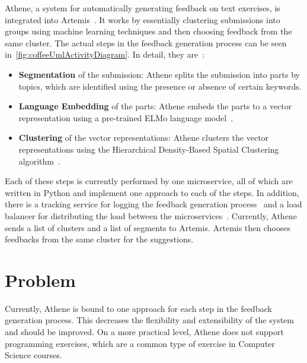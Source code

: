 Athene, a system for automatically generating feedback on text exercises, is integrated into Artemis~\cite{cofee}. It works by essentially clustering submissions into groups using machine learning techniques and then choosing feedback from the same cluster. The actual steps in the feedback generation process can be seen in~\cref{fig:coffeeUmlActivityDiagram}. In detail, they are~\cite{cofee}:
\begin{itemize}
    \item \textbf{Segmentation} of the submission: Athene splits the submission into parts by topics, which are identified using the presence or absence of certain keywords.
    \item \textbf{Language Embedding} of the parts: Athene embeds the parts to a vector representation using a pre-trained ELMo language model~\cite{deepContextualizedWordRepresentations}.
    \item \textbf{Clustering} of the vector representations: Athene clusters the vector representations using the Hierarchical Density-Based Spatial Clustering algorithm~\cite{hdbsc}.
\end{itemize}

Each of these steps is currently performed by one microservice, all of which are written in Python and implement one approach to each of the steps.
In addition, there is a tracking service for logging the feedback generation process~\cite{atheneTracking} and a load balancer for distributing the load between the microservices~\cite{atheneLoadBalancer}.
Currently, Athene sends a list of clusters and a list of segments to Artemis. Artemis then chooses feedbacks from the same cluster for the suggestions.


\section*{Problem}

Currently, Athene is bound to one approach for each step in the feedback generation process. This decreases the flexibility and extensibility of the system and should be improved.
On a more practical level, Athene does not support programming exercises, which are a common type of exercise in Computer Science courses.

